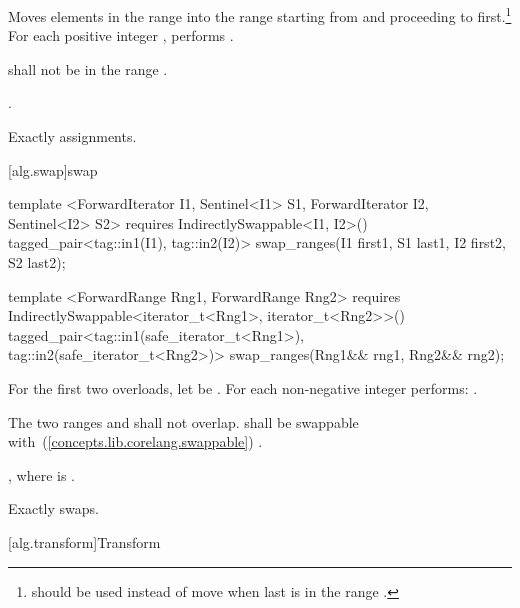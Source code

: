 \begin{itemdescr}
\pnum
\effects
Moves elements in the range 
into the
range 
starting from
and proceeding to first.\footnote{
should be used instead of move when last
is in
the range
.}
For each positive integer
,
performs
.

\pnum
\requires
{}
shall not be in the range
.

\pnum
\returns
{}.

\pnum
\complexity
Exactly
assignments.
\end{itemdescr}

[alg.swap]{swap}

%
\begin{itemdecl}
template <ForwardIterator I1, Sentinel<I1> S1, ForwardIterator I2, Sentinel<I2> S2>
  requires IndirectlySwappable<I1, I2>()
  tagged_pair<tag::in1(I1), tag::in2(I2)>
    swap_ranges(I1 first1, S1 last1, I2 first2, S2 last2);

template <ForwardRange Rng1, ForwardRange Rng2>
  requires IndirectlySwappable<iterator_t<Rng1>, iterator_t<Rng2>>()
  tagged_pair<tag::in1(safe_iterator_t<Rng1>), tag::in2(safe_iterator_t<Rng2>)>
    swap_ranges(Rng1&& rng1, Rng2&& rng2);
\end{itemdecl}

\begin{itemdescr}
\pnum
\effects
For the first two overloads, let  be .
For each non-negative integer 
performs:
.

\pnum
\requires
The two ranges 
and
shall not overlap.
 shall be swappable with~(\ref{concepts.lib.corelang.swappable})
.

\pnum
\returns
{}, where
 is .

\pnum
\complexity
Exactly
swaps.
\end{itemdescr}

[alg.transform]{Transform}

